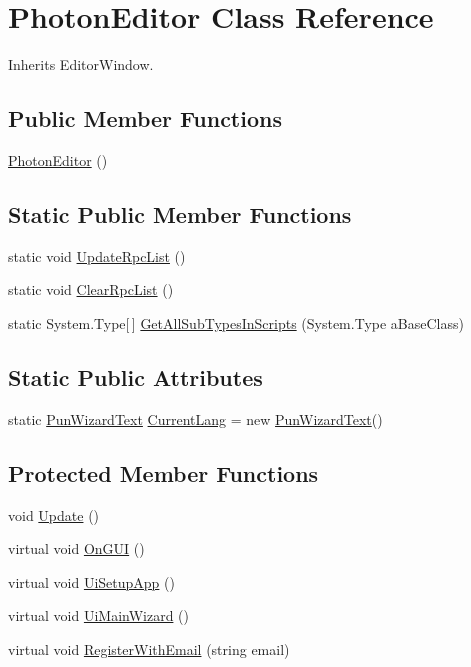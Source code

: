 \hypertarget{class_photon_editor}{}\section{Photon\+Editor Class Reference}
\label{class_photon_editor}


Inherits Editor\+Window.

\subsection*{Public Member Functions}
\begin{DoxyCompactItemize}
\item 
\hyperlink{class_photon_editor_a3969d8135c740679ac3a32048a0b50b5}{Photon\+Editor} ()
\end{DoxyCompactItemize}
\subsection*{Static Public Member Functions}
\begin{DoxyCompactItemize}
\item 
static void \hyperlink{class_photon_editor_a2b113824952b620b9f866b19cb02bb9f}{Update\+Rpc\+List} ()
\item 
static void \hyperlink{class_photon_editor_a7b6ed3bf9fe915eb2bcbb2145a60e8f2}{Clear\+Rpc\+List} ()
\item 
static System.\+Type\mbox{[}$\,$\mbox{]} \hyperlink{class_photon_editor_ad4d13d2a6ea1da5d6b2a7a59547320ff}{Get\+All\+Sub\+Types\+In\+Scripts} (System.\+Type a\+Base\+Class)
\end{DoxyCompactItemize}
\subsection*{Static Public Attributes}
\begin{DoxyCompactItemize}
\item 
static \hyperlink{class_pun_wizard_text}{Pun\+Wizard\+Text} \hyperlink{class_photon_editor_addb01f74196c19993905e90bc0a32b50}{Current\+Lang} = new \hyperlink{class_pun_wizard_text}{Pun\+Wizard\+Text}()
\end{DoxyCompactItemize}
\subsection*{Protected Member Functions}
\begin{DoxyCompactItemize}
\item 
void \hyperlink{class_photon_editor_a035ff54f0df0948ded82c1a88e71bc02}{Update} ()
\item 
virtual void \hyperlink{class_photon_editor_afeb90511f45192da4b7654644174b8d3}{On\+G\+UI} ()
\item 
virtual void \hyperlink{class_photon_editor_a1aee5f81fae639aa8a67db8c359bbe7b}{Ui\+Setup\+App} ()
\item 
virtual void \hyperlink{class_photon_editor_a4afcc2726df4ffcd3a97ec353bb0cdb8}{Ui\+Main\+Wizard} ()
\item 
virtual void \hyperlink{class_photon_editor_a8168d66be6b6ccfe327d650436aaf773}{Register\+With\+Email} (string email)
\end{DoxyCompactItemize}
